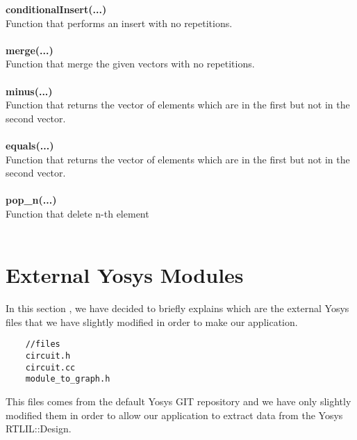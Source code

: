 \documentclass{article}
\newcommand{\sectionbreak}{\clearpage}
\begin{document}
\textbf{conditionalInsert(...)}\\
Function that performs an insert with no repetitions.\\\\

\textbf{merge(...)}\\
Function that merge the given vectors with no repetitions.\\\\

\textbf{minus(...)}\\
Function that returns the vector of elements which are in the first but not in the second vector.\\\\

\textbf{equals(...)}\\
Function that returns the vector of elements which are in the first but not in the second vector.\\\\

\textbf{pop\_n(...)}\\
Function that delete n-th element\\\\

\sectionbreak{\clearpage}


\part{External Yosys Modules}

In this section , we have decided to briefly explains which are the external Yosys files that we have slightly modified in order to make our application.\\

\begin{mdframed}[hidealllines=true, backgroundcolor=cyan!10]
	\begin{lstlisting}
	//files
	circuit.h
	circuit.cc
	module_to_graph.h
	\end{lstlisting}
\end{mdframed}

This files comes from the default Yosys GIT repository and we have only slightly modified them in order to allow our application to extract data from the Yosys RTLIL::Design.
\end{document}

